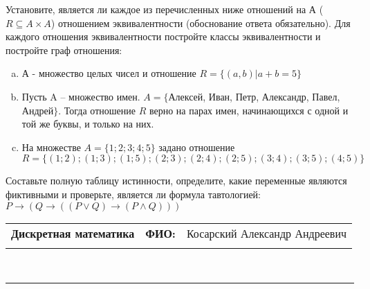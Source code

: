 \documentclass[10pt]{exam}
\newcommand{\class}{Дискретная математика}
\newcommand{\examdate}{}
\begin{document}
\begin{questions}
\question
Установите, является ли каждое из перечисленных ниже отношений на А ($R \subseteq A \times A$) отношением эквивалентности (обоснование ответа обязательно). Для каждого отношения эквивалентности постройте классы 
эквивалентности и постройте граф отношения:
\begin{enumerate} [a)]\setcounter{enumi}{0}
\item А - множество целых чисел и отношение $R = \{(a,b)|a + b = 5\}$
\item Пусть A – множество имен. $A = \{ $Алексей, Иван, Петр, Александр, Павел, Андрей$ \}$. Тогда отношение $R $ верно на парах имен, начинающихся с одной и той же буквы, и только на них.
\item На множестве $A = \{1; 2; 3; 4; 5\}$ задано отношение $R = \{(1; 2); (1; 3); (1; 5); (2; 3); (2; 4); (2; 5); (3; 4); (3; 5); (4; 5)\}$
\end{enumerate}\question Составьте полную таблицу истинности, определите, какие переменные являются фиктивными и проверьте, является ли формула тавтологией:
$ P \rightarrow (Q \rightarrow ((P \lor Q) \rightarrow (P \land Q)))$

\end{questions}
\newpage
\begin{flushright}
\begin{tabular}{p{2.8in} r l}
\textbf{\class} & \textbf{ФИО:} &Косарский Александр Андреевич
\\

\textbf{\examdate} &&\\
\end{tabular}\\
\end{flushright}
\rule[1ex]{\textwidth}{.1pt}
\end{document}
